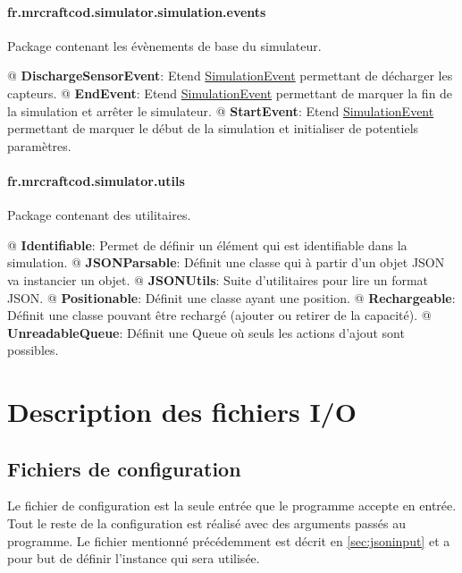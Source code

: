 \documentclass[final]{polytech/polytech}
\newcommand{\class}[1]{\textbf{#1}\label{class:#1}}
\newcommand{\klass}[1]{\hyperref[class:#1]{#1}}
\begin{document}
			\paragraph{fr.mrcraftcod.simulator.simulation.events}
				Package contenant les évènements de base du simulateur.
				
				\begin{easylist}
					@ \class{DischargeSensorEvent}: Etend \klass{SimulationEvent} permettant de décharger les capteurs.
					@ \class{EndEvent}: Etend \klass{SimulationEvent} permettant de marquer la fin de la simulation et arrêter le simulateur.
					@ \class{StartEvent}: Etend \klass{SimulationEvent} permettant de marquer le début de la simulation et initialiser de potentiels paramètres.
				\end{easylist}
				
			\paragraph{fr.mrcraftcod.simulator.utils}
				Package contenant des utilitaires.
				
				\begin{easylist}
					@ \class{Identifiable}: Permet de définir un élément qui est identifiable dans la simulation.
					@ \class{JSONParsable}: Définit une classe qui à partir d'un objet JSON va instancier un objet.
					@ \class{JSONUtils}: Suite d'utilitaires pour lire un format JSON.
					@ \class{Positionable}: Définit une classe ayant une position.
					@ \class{Rechargeable}: Définit une classe pouvant être rechargé (ajouter ou retirer de la capacité).
					@ \class{UnreadableQueue}: Définit une Queue où seuls les actions d'ajout sont possibles.
				\end{easylist}
		
	\section{Description des fichiers I/O}
		\subsection{Fichiers de configuration}
			Le fichier de configuration est la seule entrée que le programme accepte en entrée.
			Tout le reste de la configuration est réalisé avec des arguments passés au programme.
			Le fichier mentionné précédemment est décrit en \autoref{sec:jsoninput} et a pour but de définir l'instance qui sera utilisée.
			
\end{document}
